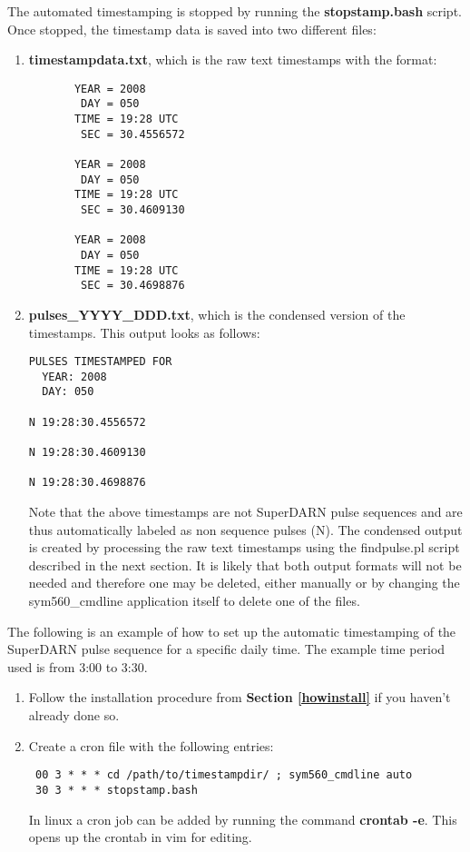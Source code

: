 \documentclass[11pt]{article}
\begin{document}
The automated timestamping is stopped by running the \textbf{stopstamp.bash} script.  Once stopped, the timestamp data is saved into two different files:
\begin{enumerate}
 \item \textbf{timestampdata.txt}, which is the raw text timestamps with the format:
\begin{verbatim}
       YEAR = 2008
        DAY = 050
       TIME = 19:28 UTC
        SEC = 30.4556572

       YEAR = 2008
        DAY = 050
       TIME = 19:28 UTC
        SEC = 30.4609130

       YEAR = 2008
        DAY = 050
       TIME = 19:28 UTC
        SEC = 30.4698876
\end{verbatim}
 \item \textbf{pulses\_YYYY\_DDD.txt}, which is the condensed version of the timestamps.  This output looks as follows:
\begin{verbatim}
PULSES TIMESTAMPED FOR
  YEAR: 2008
  DAY: 050

N 19:28:30.4556572

N 19:28:30.4609130

N 19:28:30.4698876
\end{verbatim}
Note that the above timestamps are not SuperDARN pulse sequences and are thus automatically labeled as non sequence pulses (N).  The condensed output is created by processing the raw text timestamps using the findpulse.pl script described in the next section.  It is likely that both output formats will not be needed and therefore one may be deleted, either manually or by changing the sym560\_cmdline application itself to delete one of the files.
\end{enumerate}

The following is an example of how to set up the automatic timestamping of the SuperDARN pulse sequence for a specific daily time.  The example time period used is from 3:00 to 3:30.
\begin{enumerate}
 \item Follow the installation procedure from \textbf{Section \ref{howinstall}} if you haven't already done so.
 \item Create a cron file with the following entries:
\begin{verbatim}
 00 3 * * * cd /path/to/timestampdir/ ; sym560_cmdline auto
 30 3 * * * stopstamp.bash
\end{verbatim}
 In linux a cron job can be added by running the command \textbf{crontab -e}.  This opens up the crontab in vim for editing.
\end{enumerate}
\end{document}
